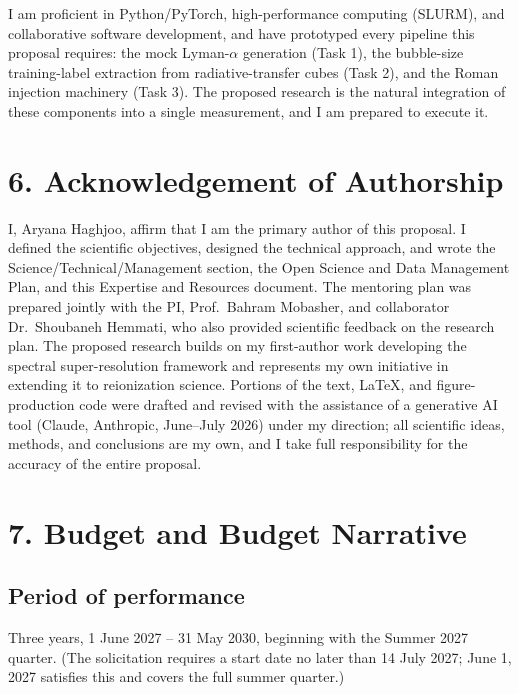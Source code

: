 \documentclass[12pt,letterpaper]{article}
\begin{document}
I am proficient in Python/PyTorch, high-performance computing (SLURM),
and collaborative software development, and have prototyped every
pipeline this proposal requires: the mock Lyman-$\alpha$ generation
(Task 1), the bubble-size training-label extraction from
radiative-transfer cubes (Task 2), and the Roman injection machinery
(Task 3). The proposed research is the natural integration of these
components into a single measurement, and I am prepared to execute it.

\clearpage
\section*{6. Acknowledgement of Authorship}

I, Aryana Haghjoo, affirm that I am the primary author of this proposal.
I defined the scientific objectives, designed the technical approach,
and wrote the Science/Technical/Management section, the Open Science and
Data Management Plan, and this Expertise and Resources document. The
mentoring plan was prepared jointly with the PI, Prof.\ Bahram Mobasher,
and collaborator Dr.\ Shoubaneh Hemmati, who also provided scientific
feedback on the research plan. The proposed research builds on my
first-author work developing the spectral super-resolution framework and
represents my own initiative in extending it to reionization science.
Portions of the text, \LaTeX, and figure-production code were drafted
and revised with the assistance of a generative AI tool (Claude,
Anthropic, June--July 2026) under my direction; all scientific ideas,
methods, and conclusions are my own, and I take full responsibility for
the accuracy of the entire proposal.

\section*{7. Budget and Budget Narrative}


\subsection*{Period of performance}
Three years, 1 June 2027 -- 31 May 2030, beginning with the Summer 2027
quarter. (The solicitation requires a start date no later than 14 July
2027; June 1, 2027 satisfies this and covers the full summer quarter.)
\end{document}
